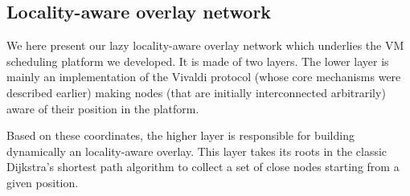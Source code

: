

\subsection{Locality-aware  overlay network \label{ssec:lao}}

We here present our lazy locality-aware overlay network which underlies the VM
scheduling platform we developed. It is made of two layers. The lower layer is
mainly an implementation of the Vivaldi protocol (whose core mechanisms were
described earlier) making nodes (that are initially interconnected arbitrarily)
aware of their position in the platform. 

Based on these coordinates, the higher layer is responsible for building
dynamically an locality-aware overlay. This layer takes its roots in the classic
Dijkstra's shortest path algorithm to collect a set of close nodes starting from
a given position.







